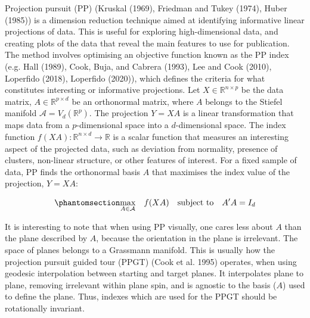 \documentclass[
  12pt,
]{interact}
\theoremstyle{plain}
\begin{document}
Projection pursuit (PP) (Kruskal (1969), Friedman and Tukey (1974),
Huber (1985)) is a dimension reduction technique aimed at identifying
informative linear projections of data. This is useful for exploring
high-dimensional data, and creating plots of the data that reveal the
main features to use for publication. The method involves optimising an
objective function known as the PP index (e.g. Hall (1989), Cook, Buja,
and Cabrera (1993), Lee and Cook (2010), Loperfido (2018), Loperfido
(2020)), which defines the criteria for what constitutes interesting or
informative projections. Let \(X \in \mathbb{R}^{n\times p}\) be the
data matrix, \(A \in\mathbb{R}^{p \times d}\) be an orthonormal matrix,
where \(A\) belongs to the Stiefel manifold
\(\mathcal{A} = V_d(\mathbb{R}^p)\). The projection \(Y = XA\) is a
linear transformation that maps data from a \(p\)-dimensional space into
a \(d\)-dimensional space. The index function
\(f(XA): \mathbb{R}^{n \times d} \to \mathbb{R}\) is a scalar function
that measures an interesting aspect of the projected data, such as
deviation from normality, presence of clusters, non-linear structure, or
other features of interest. For a fixed sample of data, PP finds the
orthonormal basis \(A\) that maximises the index value of the
projection, \(Y = XA\):

\begin{equation}\phantomsection\label{eq-optimization}{
\underset{A \in \mathcal{A}}{\max } \quad f(XA) \quad \text{subject to} \quad A'A = I_d
}\end{equation}

It is interesting to note that when using PP visually, one cares less
about \(A\) than the plane described by \(A\), because the orientation
in the plane is irrelevant. The space of planes belongs to a Grassmann
manifold. This is usually how the projection pursuit guided tour (PPGT)
(Cook et al. 1995) operates, when using geodesic interpolation between
starting and target planes. It interpolates plane to plane, removing
irrelevant within plane spin, and is agnostic to the basis (\(A\)) used
to define the plane. Thus, indexes which are used for the PPGT should be
rotationally invariant.
\end{document}
